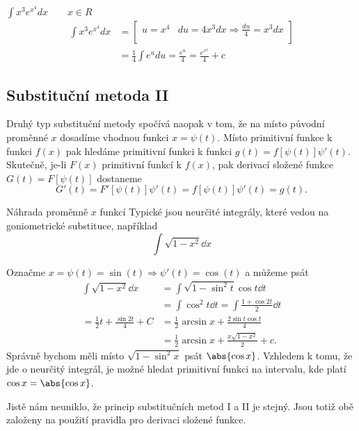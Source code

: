      \begin{example}$\displaystyle\int{x^3e^{x^4}}dx \qquad x\in R$
        \begin{align*}
          \displaystyle\int{x^3e^{x^4}}dx
             &= 
             \left[
               \begin{array}{cc}
                  u=x^4   & du=4x^3dx \Rightarrow \displaystyle\frac{du}{4} = x^3dx  \\
               \end{array}
             \right]                                                                           \\
             &= \frac{1}{4}\int{e^u}du = \frac{e^u}{4} = \frac{e^{x^4}}{4} + c 
        \end{align*}
      \end{example}

    \subsection{Substituční metoda II}
      Druhý typ substituční metody spočívá naopak v tom, že na místo původní proměnné \(x\) 
      dosadíme vhodnou funkci \(x = \psi(t)\). Místo primitivní funkce k funkci \(f(x)\) pak 
      hledáme primitivní funkci k funkci \(g(t) = f[\psi(t)]\psi'(t)\). Skutečně, je-li \(F(x)\) 
      primitivní funkcí k \(f(x)\), pak derivací složené funkce \(G(t) = F[\psi(t)]\) dostaneme
      \begin{equation*}
       G'(t) = F'[\psi(t)]\psi'(t) = f[\psi(t)]\psi'(t) = g(t).
      \end{equation*}
      
      \begin{example} Náhrada proměnně \(x\) funkcí
        Typické jsou neurčité integrály, které vedou na goniometrické substituce, například
        \[\int\sqrt{1-x^2}\dd{x}\]
        
        Označme \(x=\psi(t)=\sin(t)  \Rightarrow \psi'(t)=\cos(t)\) a můžeme psát
        \begin{align*}
          \int\sqrt{1-x^2}\dd{x} 
            &= \int\sqrt{1-\sin^2t}\cos t\dd{t}                      \\
            &= \int\cos^2 t \dd{t} = \int\frac{1+\cos2t}{2}\dd{t}    \\
          = \frac{1}{2}t+\frac{\sin2t}{4}+C
            &= \frac{1}{2}\arcsin x + \frac{2\sin t\cos t}{4}        \\
            &= \frac{1}{2}\arcsin x + \frac{x\sqrt{1-x^2}}{2} + c.
        \end{align*}
        Správně bychom měli místo \(\sqrt{1 - \sin^2x}\) psát \(\abs{\cos x}\). Vzhledem k tomu, že 
        jde o neurčitý integrál, je možné hledat primitivní funkci na intervalu, kde platí \(\cos x 
        = \abs{\cos x}\).
      \end{example}
      Jistě nám neuniklo, že princip substitučních metod I a II je stejný. Jsou totiž obě založeny 
      na použití pravidla pro derivaci složené funkce.
  
